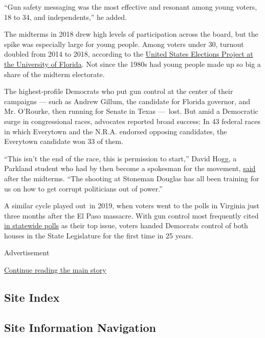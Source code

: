 ``Gun safety messaging was the most effective and resonant among young
voters, 18 to 34, and independents,'' he added.

The midterms in 2018 drew high levels of participation across the board,
but the spike was especially large for young people. Among voters under
30, turnout doubled from 2014 to 2018, according to the
\href{http://www.electproject.org/home/voter-turnout/demographics}{United
States Elections Project at the University of Florida}. Not since the
1980s had young people made up so big a share of the midterm electorate.

The highest-profile Democrats who put gun control at the center of their
campaigns --- such as Andrew Gillum, the candidate for Florida governor,
and Mr. O'Rourke, then running for Senate in Texas ---~lost. But amid a
Democratic surge in congressional races, advocates reported broad
success: In 43 federal races in which Everytown and the N.R.A. endorsed
opposing candidates, the Everytown candidate won 33 of them.

``This isn't the end of the race, this is permission to start,'' David
Hogg, a Parkland student who had by then become a spokesman for the
movement,
\href{https://www.sun-sentinel.com/local/broward/parkland/florida-school-shooting/fl-ne-whats-next-march-for-our-lives-20181107-story.html}{said}
after the midterms. ``The shooting at Stoneman Douglas has all been
training for us on how to get corrupt politicians out of power.''

A similar cycle played out~in 2019, when voters went to the polls in
Virginia just three months after the El Paso massacre. With gun control
most frequently cited
\href{https://www.washingtonpost.com/context/washington-post-schar-school-virginia-poll-sept-25-30-2019/26848165-b676-4baa-9c70-cad966571930/?itid=lk_inline_manual_1}{in
statewide polls} as their top issue, voters handed Democrats control of
both houses in the State Legislature for the first time in 25 years.

Advertisement

\protect\hyperlink{after-bottom}{Continue reading the main story}

\hypertarget{site-index}{%
\subsection{Site Index}\label{site-index}}

\hypertarget{site-information-navigation}{%
\subsection{Site Information
Navigation}\label{site-information-navigation}}


